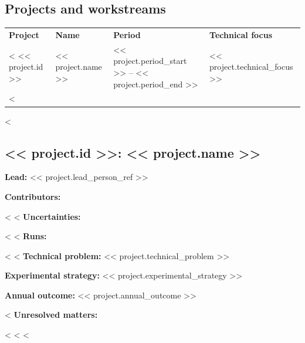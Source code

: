 \documentclass[11pt]{article}
\begin{document}
\begin{itemize}
\begin{itemize}
\begin{itemize}
\begin{itemize}
\clearpage
\section{Projects and workstreams}
\begin{xltabular}{\textwidth}{L{2.5cm}L{3.8cm}L{2.8cm}Y}
\textbf{Project} & \textbf{Name} & \textbf{Period} & \textbf{Technical focus} \\
<%
<< project.id >> & << project.name >> & << project.period_start >> -- << project.period_end >> & << project.technical_focus >> \\
<%
\end{xltabular}

<%
\subsection{<< project.id >>: << project.name >>}
\textbf{Lead:} << project.lead_person_ref >>

\textbf{Contributors:}
\begin{itemize}
<%
<%
\textbf{Uncertainties:}
\begin{itemize}
<%
<%
\textbf{Runs:}
\begin{itemize}
<%
<%
\textbf{Technical problem:} << project.technical_problem >>

\textbf{Experimental strategy:} << project.experimental_strategy >>

\textbf{Annual outcome:} << project.annual_outcome >>

<%
\textbf{Unresolved matters:}
\begin{itemize}
<%
<%
<%


\end{itemize}
\end{itemize}
\end{itemize}
\end{itemize}
\end{itemize}
\end{itemize}
\end{itemize}
\end{itemize}
\end{document}
